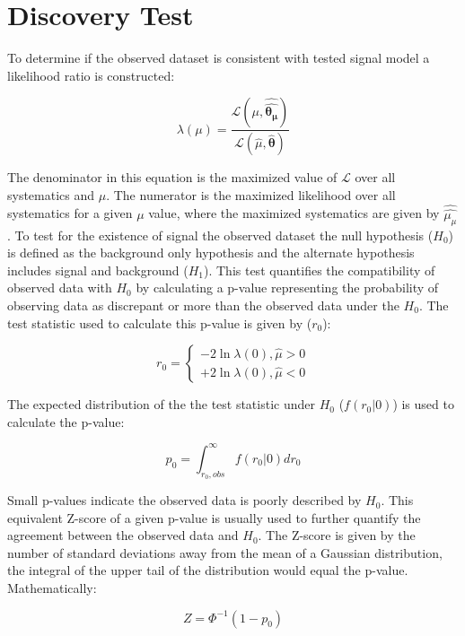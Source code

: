 \section{Discovery Test}
To determine if the observed dataset is consistent with tested signal model a likelihood ratio is constructed:

\begin{equation}
\lambda(\mu)=\frac{\mathcal{L}(\mu, \hat{\hat{\bm{\theta_{\mu}}}})}{\mathcal{L}(\hat{\mu}, \hat{\bm{\theta}})}
\end{equation}

The denominator in this equation is the maximized value of $\mathcal{L}$ over all systematics and $\mu$. The numerator is the maximized likelihood over all systematics for a given $\mu$ value, where the maximized systematics are given by $\hat{\hat{\mu_{\mu}}}$. To test for the existence of signal the observed dataset the null hypothesis ($H_{0}$) is defined as the background only hypothesis and the alternate hypothesis includes signal and background ($H_{1}$). This test quantifies the compatibility of observed data with $H_{0}$ by calculating a p-value representing the probability of observing data as discrepant or more than the observed data under the $H_{0}$. The test statistic used to calculate this p-value is given by ($r_{0}$):

\begin{equation}
r_{0}=\left\{ \begin{array}{ll}
-2\ln \lambda (0), \hat{\mu} > 0\\
+2\ln \lambda (0), \hat{\mu} < 0
\end{array}
\right.
\end{equation}

The expected distribution of the the test statistic under $H_{0}$ ($f(r_{0}|0)$) is used to calculate the p-value:

\begin{equation}
p_{0}=\int_{r_0,obs}^{\infty} f(r_{0}|0)dr_{0}
\end{equation}

Small p-values indicate the observed data is poorly described by $H_{0}$. This equivalent Z-score of a given p-value is usually used to further quantify the agreement between the observed data and $H_{0}$. The Z-score is given by the number of standard deviations away from the mean of a Gaussian distribution, the integral of the upper tail of the distribution would equal the p-value. Mathematically:

\begin{equation}
Z = \Phi^{-1}(1-p_{0})
\end{equation}

